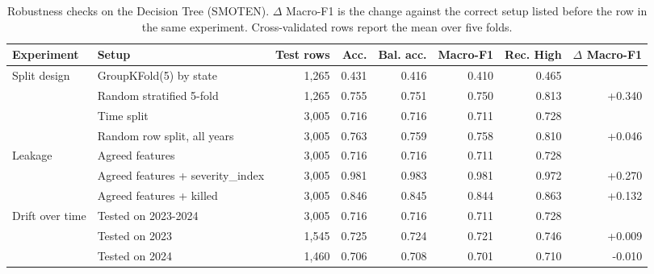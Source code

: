 \begin{table}[t]
\caption{Robustness checks on the Decision Tree (SMOTEN). $\Delta$ Macro-F1 is the change against the correct setup listed before the row in the same experiment. Cross-validated rows report the mean over five folds.}
\label{tab:robustness}
\begin{tabular}{llrrrrrr}
\toprule
Experiment & Setup & Test rows & Acc. & Bal. acc. & Macro-F1 & Rec. High & $\Delta$ Macro-F1 \\
\midrule
Split design & GroupKFold(5) by state & 1{,}265 & 0.431 & 0.416 & 0.410 & 0.465 &  \\
 & Random stratified 5-fold & 1{,}265 & 0.755 & 0.751 & 0.750 & 0.813 & +0.340 \\
 & Time split & 3{,}005 & 0.716 & 0.716 & 0.711 & 0.728 &  \\
 & Random row split, all years & 3{,}005 & 0.763 & 0.759 & 0.758 & 0.810 & +0.046 \\
\midrule
Leakage & Agreed features & 3{,}005 & 0.716 & 0.716 & 0.711 & 0.728 &  \\
 & Agreed features + severity\_index & 3{,}005 & 0.981 & 0.983 & 0.981 & 0.972 & +0.270 \\
 & Agreed features + killed & 3{,}005 & 0.846 & 0.845 & 0.844 & 0.863 & +0.132 \\
\midrule
Drift over time & Tested on 2023-2024 & 3{,}005 & 0.716 & 0.716 & 0.711 & 0.728 &  \\
 & Tested on 2023 & 1{,}545 & 0.725 & 0.724 & 0.721 & 0.746 & +0.009 \\
 & Tested on 2024 & 1{,}460 & 0.706 & 0.708 & 0.701 & 0.710 & -0.010 \\
\bottomrule
\end{tabular}
\end{table}
